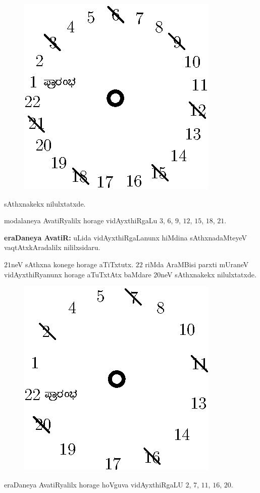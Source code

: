 \begin{figure}[H]
\centering
\includegraphics[scale=0.8]{src/figures/fig9.eps}
\end{figure}
 sAthxnakekx nilulxtatxde.

modalaneya AvatiRyalilx horage vidAyxthiRgaLu $3$, $6$, $9$, $12$, $15$, $18$, $21$.

{\bf eraDaneya AvatiR:} uLida vidAyxthiRgaLanunx hiMdina sAthxnadaMteyeV vaqtAtxkAradalilx nililxsidaru.

$21$neV sAthxna konege horage aTiTxtutx. $22$ riMda AraMBisi parxti mUraneV vidAyxthiRyanunx horage aTuTxtAtx baMdare $20$neV sAthxnakekx nilulxtatxde. 
\begin{figure}[H]
\centering
\includegraphics[scale=0.8]{src/figures/fig10.eps}
\end{figure}
eraDaneya AvatiRyalilx horage hoVguva vidAyxthiRgaLU $2$, $7$, $11$, $16$, $20$.

